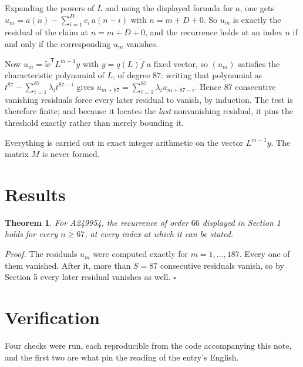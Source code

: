 \documentclass[11pt]{article}
\newtheorem{theorem}{Theorem}
\theoremstyle{definition}
\begin{document}
Expanding the powers of $L$ and using the displayed formula for $a$, one gets $u_m = a(n) - \sum_{i=1}^{D} c_i\,a(n-i)$ with $n = m + D + 0$. So $u_m$ is exactly the residual of the claim at $n = m + D + 0$, and the recurrence holds at an index $n$ if and only if the corresponding $u_m$ vanishes.

Now $u_m = \tilde w^{\mathsf T} L^{m-1} y$ with $y = q(L)\tilde f$ a fixed vector, so $(u_m)$ satisfies the characteristic polynomial of $L$, of degree $87$: writing that polynomial as $t^{87} - \sum_{i=1}^{87} \lambda_i t^{87-i}$ gives $u_{m+87} = \sum_{i=1}^{87} \lambda_i u_{m+87-i}$. Hence $87$ consecutive vanishing residuals force every later residual to vanish, by induction. The test is therefore finite; and because it locates the {\itshape last} nonvanishing residual, it pins the threshold exactly rather than merely bounding it.

Everything is carried out in exact integer arithmetic on the vector $L^{m-1}y$. The matrix $M$ is never formed.

\section{Results}

\begin{theorem} For A249954, the recurrence of order $66$ displayed in Section 1 holds for every $n \ge 67$, at every index at which it can be stated.\end{theorem}

{\itshape Proof.} The residuals $u_m$ were computed exactly for $m = 1,\dots,187$. Every one of them vanished. After it, more than $S = 87$ consecutive residuals vanish, so by Section 5 every later residual vanishes as well. $\square$

\section{Verification}

Four checks were run, each reproducible from the code accompanying this note, and the first two are what pin the reading of the entry's English.
\end{document}
